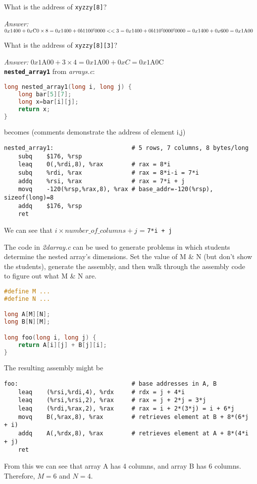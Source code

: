 \documentclass{article}
\newcommand{\function}[1]{\textbf{\lstinline{#1}}}
\begin{document}
What is the address of \lstinline{xyzzy[8]}?

\textit{Answer:} $0x1400 + 0x\textrm{C}0 \times 8 = 0x1400 + 0b1100'0000 << 3 = \\ 0x1400 + 0b110'0000'0000 = 0x1400 + 0x600 = 0x1\mathrm{A}00$

What is the address of \lstinline{xyzzy[8][3]}?

\textit{Answer:} $0x1\mathrm{A}00 + 3 \times 4 = 0x1\mathrm{A}00 + 0xC = 0x1\mathrm{A}0\textrm{C}$ \\

\function{nested_array1} from \textit{arrays.c}:
\begin{lstlisting}[language=C]
long nested_array1(long i, long j) {
    long bar[5][7];
    long x=bar[i][j];
    return x;
}
\end{lstlisting}
becomes (comments demonstrate the address of element i,j)
\begin{lstlisting}[language={[x86masm]Assembler}]
nested_array1:                      # 5 rows, 7 columns, 8 bytes/long
    subq    $176, %rsp
    leaq    0(,%rdi,8), %rax        # rax = 8*i
    subq    %rdi, %rax              # rax = 8*i-i = 7*i
    addq    %rsi, %rax              # rax = 7*i + j
    movq    -120(%rsp,%rax,8), %rax # base_addr=-120(%rsp), sizeof(long)=8
    addq    $176, %rsp
    ret
\end{lstlisting}
We can see that $i \times number\_of\_columns + j$ = \lstinline{7*i + j}

The code in \textit{2darray.c} can be used to generate problems in which students determine the nested array's dimensions.
Set the value of M \& N (but don't show the students), generate the assembly, and then walk through the assembly code to figure out what M \& N are.

\begin{lstlisting}[language=C]
#define M ...
#define N ...

long A[M][N];
long B[N][M];

long foo(long i, long j) {
    return A[i][j] + B[j][i];
}
\end{lstlisting}

The resulting assembly might be
\begin{lstlisting}[language={[x86masm]Assembler}]
foo:                                # base addresses in A, B
    leaq    (%rsi,%rdi,4), %rdx     # rdx = j + 4*i
    leaq    (%rsi,%rsi,2), %rax     # rax = j + 2*j = 3*j
    leaq    (%rdi,%rax,2), %rax     # rax = i + 2*(3*j) = i + 6*j
    movq    B(,%rax,8), %rax        # retrieves element at B + 8*(6*j + i)
    addq    A(,%rdx,8), %rax        # retrieves element at A + 8*(4*i + j)
    ret
\end{lstlisting}
From this we can see that array A has 4 columns, and array B has 6 columns.
Therefore, $M=6$ and $N=4$.
\end{document}
